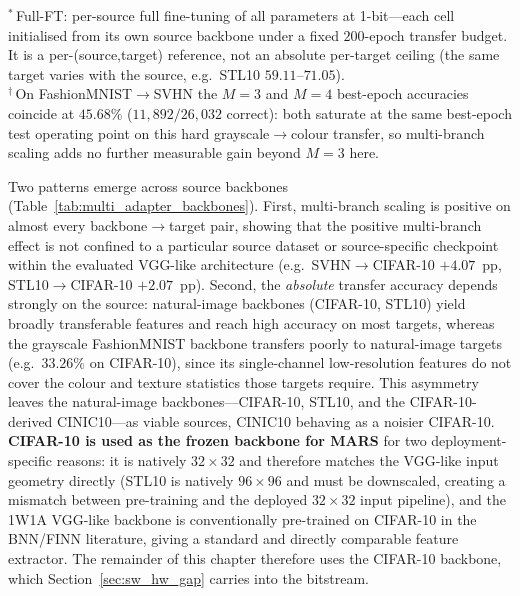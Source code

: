 \documentclass[12pt, a4paper]{report}
\numberwithin{equation}{chapter}
\numberwithin{figure}{chapter}
\numberwithin{table}{chapter}
\numberwithin{algorithm}{chapter}
\begin{document}
\begin{table}[H]
\vspace{2pt}
{\footnotesize $^{*}$\,Full-FT: per-source full fine-tuning of all parameters at 1-bit---each cell initialised from its own source backbone under a fixed $200$-epoch transfer budget. It is a per-(source,target) reference, not an absolute per-target ceiling (the same target varies with the source, e.g.\ STL10 $59.11$--$71.05$).}
\\[1pt]{\footnotesize $^{\dagger}$\,On FashionMNIST$\to$SVHN the $M{=}3$ and $M{=}4$ best-epoch accuracies coincide at $45.68\%$ ($11{,}892/26{,}032$ correct): both saturate at the same best-epoch test operating point on this hard grayscale$\to$colour transfer, so multi-branch scaling adds no further measurable gain beyond $M{=}3$ here.}
\end{table}

Two patterns emerge across source backbones (Table~\ref{tab:multi_adapter_backbones}). First, multi-branch scaling is positive on almost every backbone$\to$target pair, showing that the positive multi-branch effect is not confined to a particular source dataset or source-specific checkpoint within the evaluated VGG-like architecture (e.g.\ SVHN$\to$CIFAR-10 $+4.07$~pp, STL10$\to$CIFAR-10 $+2.07$~pp). Second, the \emph{absolute} transfer accuracy depends strongly on the source: natural-image backbones (CIFAR-10, STL10) yield broadly transferable features and reach high accuracy on most targets, whereas the grayscale FashionMNIST backbone transfers poorly to natural-image targets (e.g.\ $33.26\%$ on CIFAR-10), since its single-channel low-resolution features do not cover the colour and texture statistics those targets require. This asymmetry leaves the natural-image backbones---CIFAR-10, STL10, and the CIFAR-10-derived CINIC10---as viable sources, CINIC10 behaving as a noisier CIFAR-10. \textbf{CIFAR-10 is used as the frozen backbone for MARS} for two deployment-specific reasons: it is natively $32\times 32$ and therefore matches the VGG-like input geometry directly (STL10 is natively $96\times 96$ and must be downscaled, creating a mismatch between pre-training and the deployed $32\times 32$ input pipeline), and the 1W1A VGG-like backbone is conventionally pre-trained on CIFAR-10 in the BNN/FINN literature, giving a standard and directly comparable feature extractor. The remainder of this chapter therefore uses the CIFAR-10 backbone, which Section~\ref{sec:sw_hw_gap} carries into the bitstream.
\end{document}

